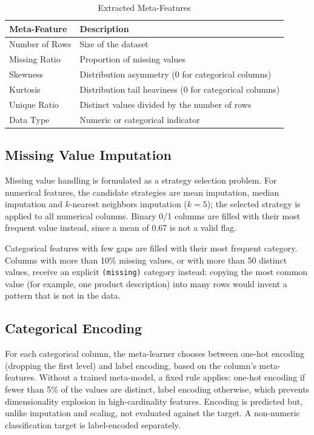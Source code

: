 \documentclass[11pt,a4paper]{article}
\begin{document}
\begin{table}[h]
\centering
\caption{Extracted Meta-Features}
\label{tab:metafeatures}
\begin{tabular}{ll}
\toprule
\textbf{Meta-Feature} & \textbf{Description} \\
\midrule
Number of Rows & Size of the dataset \\
Missing Ratio & Proportion of missing values \\
Skewness & Distribution asymmetry (0 for categorical columns) \\
Kurtosis & Distribution tail heaviness (0 for categorical columns) \\
Unique Ratio & Distinct values divided by the number of rows \\
Data Type & Numeric or categorical indicator \\
\bottomrule
\end{tabular}
\end{table}

\subsection{Missing Value Imputation}

Missing value handling is formulated as a strategy selection problem. For numerical features, the candidate strategies are mean imputation, median imputation and $k$-nearest neighbors imputation ($k=5$); the selected strategy is applied to all numerical columns. Binary 0/1 columns are filled with their most frequent value instead, since a mean of 0.67 is not a valid flag.

Categorical features with few gaps are filled with their most frequent category. Columns with more than 10\% missing values, or with more than 50 distinct values, receive an explicit \texttt{(missing)} category instead: copying the most common value (for example, one product description) into many rows would invent a pattern that is not in the data.

\subsection{Categorical Encoding}

For each categorical column, the meta-learner chooses between one-hot encoding (dropping the first level) and label encoding, based on the column's meta-features. Without a trained meta-model, a fixed rule applies: one-hot encoding if fewer than 5\% of the values are distinct, label encoding otherwise, which prevents dimensionality explosion in high-cardinality features. Encoding is predicted but, unlike imputation and scaling, not evaluated against the target. A non-numeric classification target is label-encoded separately.
\end{document}

